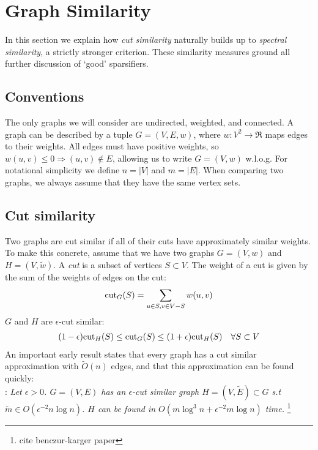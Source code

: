 \documentclass{article}
\begin{document}
\section{Graph Similarity}

In this section we explain how \textit{cut similarity} naturally builds up
to \textit{spectral similarity}, a strictly stronger criterion. These
similarity measures ground all further discussion of `good' sparsifiers.

\subsection{Conventions}

The only graphs we will consider are undirected, weighted, and connected. A
graph can be described by a tuple $G = (V, E, w)$, where $w : V^2
\rightarrow \Re$ maps edges to their weights. All edges must have positive
weights, so $w(u, v) \leq 0 \Rightarrow (u, v) \not\in E$, allowing us to
write $G = (V, w)$ w.l.o.g. For notational simplicity we define $n = |V|$
and $m = |E|$. When comparing two graphs, we always assume that they have
the same vertex sets.

\subsection{Cut similarity}

Two graphs are cut similar if all of their cuts have approximately similar
weights. To make this concrete, assume that we have two graphs $G = (V, w)$
and $H = (V, \tilde{w})$. A \textit{cut} is a subset of vertices $S \subset
V$. The weight of a cut is given by the sum of the weights of edges on the
cut:
\begin{align*}
    \text{cut}_{G}(S) = \sum_{u \in S, v \in V - S} w(u, v)
\end{align*}
$G$ and $H$ are $\epsilon$-cut similar:
\begin{align*}
    (1 - \epsilon)\text{cut}_{H}(S) \leq \text{cut}_{G}(S) \leq (1 + \epsilon)\text{cut}_{H}(S)
    \quad \forall{S \subset V}
\end{align*}
An important early result states that every graph has a cut similar
approximation with $\tilde{O}(n)$ edges, and that this approximation can be
found quickly: \\

\noindent
{}: \textit{Let $\epsilon > 0$. $G =
(V, E)$ has an $\epsilon$-cut similar graph $H = (V, \tilde{E}) \subset G$
s.t $\tilde{m} \in O(\epsilon^{-2}n\log n)$. $H$ can be found in $O(m\log^3n
+ \epsilon^{-2}m\log n)$ time.} \footnote{cite benczur-karger paper} \\
\end{document}
